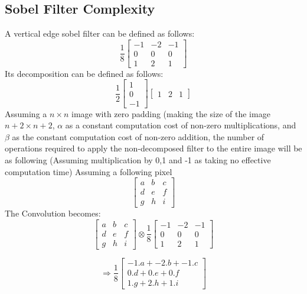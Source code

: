 \documentclass[a4paper,11pt]{article}
\begin{document}
\subsection{Sobel Filter Complexity}
A vertical edge sobel filter can be defined as follows:
\[
\frac{1}{8}
\begin{bmatrix}
     -1&-2&-1\\
     0&0&0\\
     1&2&1
\end{bmatrix}
\]
\newline
Its decomposition can be defined as follows:
\[
\frac{1}{2}
\begin{bmatrix}
    1\\0\\-1
\end{bmatrix}
\begin{bmatrix}
    1&2&1
\end{bmatrix}
\]
\newline
Assuming a $n \times n$ image with zero padding (making the size of the image $n+2 \times n+2$, $\alpha$ as a constant computation cost of non-zero multiplications, and $\beta$ as the constant computation cost of non-zero addition, the number of operations required to apply the non-decomposed filter to the entire image will be as following (Assuming multiplication by 0,1 and -1 as taking no effective computation time)
\newline
Assuming a following pixel
\[
\begin{bmatrix}
     a&b&c\\
     d&e&f\\
     g&h&i
\end{bmatrix}
\]
\newline
The Convolution becomes:
\[
\begin{bmatrix}
     a&b&c\\
     d&e&f\\
     g&h&i
\end{bmatrix}
 \otimes \frac{1}{8}\begin{bmatrix}
     -1&-2&-1\\
     0&0&0\\
     1&2&1
\end{bmatrix}
\]

\[
\Rightarrow \frac{1}{8}\begin{bmatrix}
     -1.a+-2.b+-1.c\\
     0.d+0.e+0.f\\
     1.g+2.h+1.i
\end{bmatrix}
\]
\end{document}
